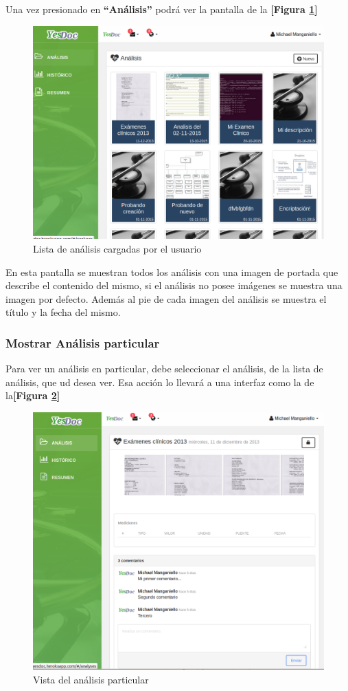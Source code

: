 Una vez presionado en \textbf{``Análisis''} podrá ver la pantalla de la \textbf{[Figura \ref{mu-listar_analisis}]}


\begin{figure}
	\centering
	\includegraphics[width=.8\textwidth]{img/manual_de_usuario/listar_analisis}
	\caption{Lista de análisis cargadas por el usuario}
	\label{mu-listar_analisis}
\end{figure}
 
 
 En esta pantalla se muestran todos los análisis con una imagen de portada que describe  el contenido del mismo, si el análisis no posee imágenes se muestra una imagen por defecto. Además al pie de cada imagen del análisis se muestra el título y la fecha del mismo.
 

 \subsubsection{Mostrar Análisis particular}
Para ver un análisis en particular, debe seleccionar el análisis, de la lista de análisis, que ud desea ver. Esa acción lo llevará a una interfaz como la de la\textbf{[Figura \ref{mu-analisis_particular}]}
\begin{figure}
	\centering
	\includegraphics[width=.8\textwidth]{img/manual_de_usuario/analisis_particular}
	\caption{Vista del análisis particular}
	\label{mu-analisis_particular}
\end{figure}


